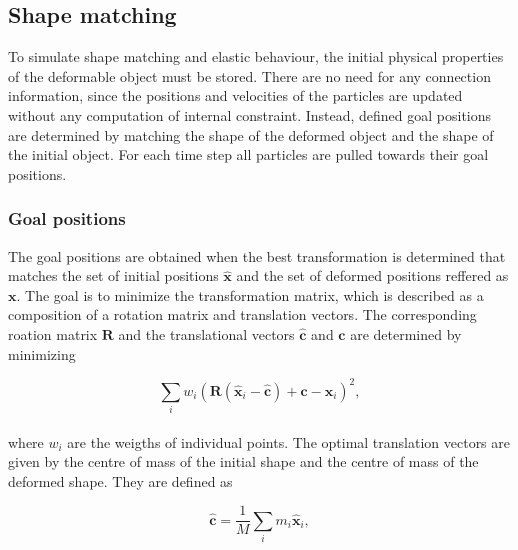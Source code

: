 \subsection{Shape matching}

To simulate shape matching and elastic behaviour, the initial physical properties of the deformable
object must be stored. There are no need for any connection information, since the positions and velocities of the particles 
are updated without any computation of internal constraint. Instead, defined goal positions are determined by matching the shape of the deformed 
object and the shape of the initial object. For each time step all particles are pulled towards their goal positions.

\subsubsection{Goal positions}
The goal positions are obtained when the best transformation is determined that matches the set of initial positions 
$\mathbf{\hat{x}}$ and the set of deformed positions reffered as $\mathbf{x}$. The goal is to minimize the transformation matrix, 
which is described as a composition of a rotation matrix 
and translation vectors. The corresponding roation matrix $\mathbf{R}$ and the translational vectors
$\mathbf{\hat{c}}$ and $\mathbf{c}$ are determined by minimizing 

\begin{equation}
\label{eq:MinR}
\sum\limits_{i} w_{i}\left(\mathbf{R}(\mathbf{\hat{x}}_{i} - \mathbf{\hat{c}}) + \mathbf{c} - \mathbf{x}_{i} \right)^{2},
\end{equation}
\\
where $w_{i}$ are the weigths of individual points. The optimal translation vectors are given by the centre of mass of the initial shape and the centre of mass
of the deformed shape. They are defined as

\begin{equation}
\label{eq:TransVec}
\mathbf{\hat{c}} = \frac{1}{M} \sum\limits_{i} m_{i}\mathbf{\hat{x}}_{i} , 
\end{equation}
